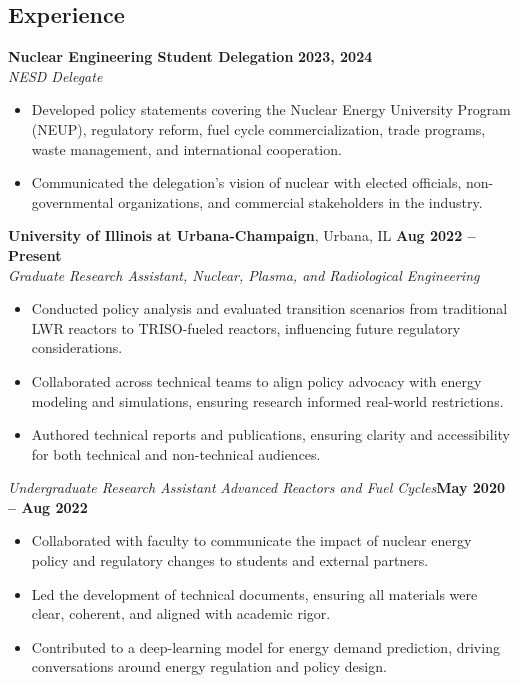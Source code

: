 \documentclass[margin,line]{resume}
\begin{document}
\begin{resume}
    \section{\mysidestyle Experience}
    \textbf{Nuclear Engineering Student Delegation} \hfill \textbf{2023, 2024} \\
    \textsl{NESD Delegate} \\
    \begin{itemize}
        \item Developed policy statements covering the Nuclear Energy University Program (NEUP), regulatory reform, fuel cycle commercialization, trade programs, waste management, and international cooperation.
        \item Communicated the delegation's vision of nuclear with elected officials, non-governmental organizations, and commercial stakeholders in the industry.
    \end{itemize}

    \textbf{University of Illinois at Urbana-Champaign}, Urbana, IL \hfill \textbf{Aug 2022 -- Present} \\
    \textsl{Graduate Research Assistant, Nuclear, Plasma, and Radiological Engineering} \\
    \begin{itemize}
        \item Conducted policy analysis and evaluated transition scenarios from traditional LWR reactors to TRISO-fueled reactors, influencing future regulatory considerations.
        \item Collaborated across technical teams to align policy advocacy with energy modeling and simulations, ensuring research informed real-world restrictions.
        \item Authored technical reports and publications, ensuring clarity and accessibility for both technical and non-technical audiences.
    \end{itemize}

    \textsl{Undergraduate Research Assistant} \textsl{Advanced Reactors and Fuel Cycles}\hfill \textbf{May 2020 -- Aug 2022}\\
    \begin{itemize}
        \item Collaborated with faculty to communicate the impact of nuclear energy policy and regulatory changes to students and external partners.
        \item Led the development of technical documents, ensuring all materials were clear, coherent, and aligned with academic rigor.
        \item Contributed to a deep-learning model for energy demand prediction, driving conversations around energy regulation and policy design.
    \end{itemize}


\end{resume}
\end{document}
